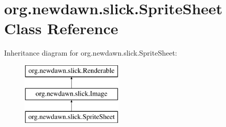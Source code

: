 \hypertarget{classorg_1_1newdawn_1_1slick_1_1_sprite_sheet}{}\section{org.\+newdawn.\+slick.\+Sprite\+Sheet Class Reference}
\label{classorg_1_1newdawn_1_1slick_1_1_sprite_sheet}
Inheritance diagram for org.\+newdawn.\+slick.\+Sprite\+Sheet\+:\begin{figure}[H]
\begin{center}
\leavevmode
\includegraphics[height=3.000000cm]{classorg_1_1newdawn_1_1slick_1_1_sprite_sheet}
\end{center}
\end{figure}
